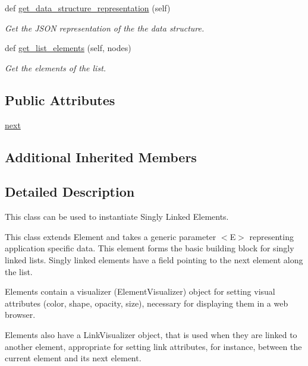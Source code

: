 \begin{DoxyCompactItemize}
\item 
def \mbox{\hyperlink{classbridges_1_1sl__element_1_1_s_lelement_af1d3039c3597ce0345d1cd973711714f}{get\+\_\+data\+\_\+structure\+\_\+representation}} (self)
\begin{DoxyCompactList}\small\item\em Get the J\+S\+ON representation of the the data structure. \end{DoxyCompactList}\item 
def \mbox{\hyperlink{classbridges_1_1sl__element_1_1_s_lelement_ad3b94c8e7540aca841e6306c190e1be1}{get\+\_\+list\+\_\+elements}} (self, nodes)
\begin{DoxyCompactList}\small\item\em Get the elements of the list. \end{DoxyCompactList}\end{DoxyCompactItemize}
\subsection*{Public Attributes}
\begin{DoxyCompactItemize}
\item 
\mbox{\hyperlink{classbridges_1_1sl__element_1_1_s_lelement_a4fa8e9321dd2ce726da047ddc64adabf}{next}}
\end{DoxyCompactItemize}
\subsection*{Additional Inherited Members}


\subsection{Detailed Description}
This class can be used to instantiate Singly Linked Elements. 

This class extends Element and takes a generic parameter $<$\+E$>$ representing application specific data. This element forms the basic building block for singly linked lists. Singly linked elements have a field pointing to the next element along the list.

\begin{DoxyVerb}Elements contain a visualizer (ElementVisualizer) object for setting visual
attributes (color, shape, opacity, size), necessary for displaying them in a
web browser.

Elements also have a LinkVisualizer object, that is used when they are linked to
another element, appropriate for setting link attributes, for instance, between
the current element and its next element.
\end{DoxyVerb}


